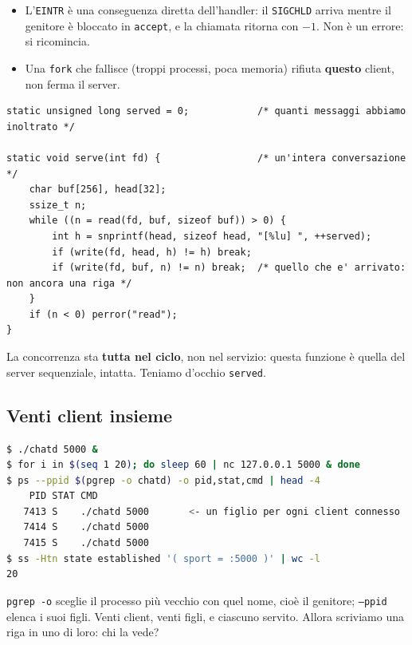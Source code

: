\begin{itemize}
    \item L'\texttt{EINTR} è una conseguenza diretta dell'handler: il \texttt{SIGCHLD} arriva mentre il genitore è
          bloccato in \texttt{accept}, e la chiamata ritorna con $-1$. Non è un errore: si ricomincia.
    \item Una \texttt{fork} che fallisce (troppi processi, poca memoria) rifiuta \textbf{questo} client, non ferma il
          server.
\end{itemize}

\begin{lstlisting}[language={[POSIX]C}, style=wnumbers, title={Il figlio: il servizio non è cambiato}]
static unsigned long served = 0;            /* quanti messaggi abbiamo inoltrato */

static void serve(int fd) {                 /* un'intera conversazione */
    char buf[256], head[32];
    ssize_t n;
    while ((n = read(fd, buf, sizeof buf)) > 0) {
        int h = snprintf(head, sizeof head, "[%lu] ", ++served);
        if (write(fd, head, h) != h) break;
        if (write(fd, buf, n) != n) break;  /* quello che e' arrivato: non ancora una riga */
    }
    if (n < 0) perror("read");
}
\end{lstlisting}

La concorrenza sta \textbf{tutta nel ciclo}, non nel servizio: questa funzione è quella del server sequenziale, intatta.
Teniamo d'occhio \texttt{served}.

\subsection{Venti client insieme}

\begin{lstlisting}[language=bash, title={Venti client, venti figli}]
$ ./chatd 5000 &
$ for i in $(seq 1 20); do sleep 60 | nc 127.0.0.1 5000 & done
$ ps --ppid $(pgrep -o chatd) -o pid,stat,cmd | head -4
    PID STAT CMD
   7413 S    ./chatd 5000       <- un figlio per ogni client connesso
   7414 S    ./chatd 5000
   7415 S    ./chatd 5000
$ ss -Htn state established '( sport = :5000 )' | wc -l
20
\end{lstlisting}

\texttt{pgrep -o} sceglie il processo più vecchio con quel nome, cioè il genitore; \texttt{--ppid} elenca i suoi figli.
Venti client, venti figli, e ciascuno servito. Allora scriviamo una riga in uno di loro: chi la vede?

